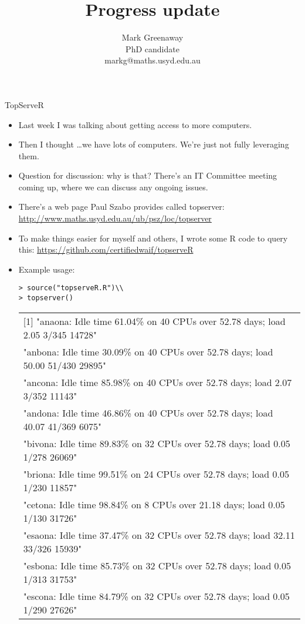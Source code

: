 \documentclass{beamer}
\title{Progress update}
\author{Mark Greenaway\\PhD candidate\\markg@maths.usyd.edu.au}
\begin{document}
\begin{frame}
\titlepage
\end{frame}

\begin{frame}{TopServeR}
\begin{itemize}
\item Last week I was talking about getting access to more computers.
\item Then I thought \ldots we have lots of computers. We're just not fully leveraging them.
\item Question for discussion: why is that? There's an IT Committee meeting coming up, where we can discuss
			any ongoing issues.
\item There's a web page Paul Szabo provides called topserver: \url{http://www.maths.usyd.edu.au/ub/psz/loc/topserver}
\item To make things easier for myself and others, I wrote some R code to query this: \url{https://github.com/certifiedwaif/topserveR}
\item Example usage:
\tiny
\begin{verbatim}
> source("topserveR.R")\\
> topserver()
\end{verbatim}
\begin{tabular}{l}
 [1] "anaona: Idle time 61.04\% on 40 CPUs over  52.78 days; load 2.05 3/345 14728"   \\
 [2] "anbona: Idle time 30.09\% on 40 CPUs over  52.78 days; load 50.00 51/430 29895" \\
 [3] "ancona: Idle time 85.98\% on 40 CPUs over  52.78 days; load 2.07 3/352 11143"   \\
 [4] "andona: Idle time 46.86\% on 40 CPUs over  52.78 days; load 40.07 41/369 6075"  \\
 [5] "bivona: Idle time 89.83\% on 32 CPUs over  52.78 days; load 0.05 1/278 26069"   \\
 [6] "briona: Idle time 99.51\% on 24 CPUs over  52.78 days; load 0.05 1/230 11857"   \\
 [7] "cetona: Idle time 98.84\% on  8 CPUs over  21.18 days; load 0.05 1/130 31726"   \\
 [8] "esaona: Idle time 37.47\% on 32 CPUs over  52.78 days; load 32.11 33/326 15939" \\
 [9] "esbona: Idle time 85.73\% on 32 CPUs over  52.78 days; load 0.05 1/313 31753"   \\
[10] "escona: Idle time 84.79\% on 32 CPUs over  52.78 days; load 0.05 1/290 27626"   \\

\end{tabular}
\end{itemize}
\end{frame}
\end{document}
